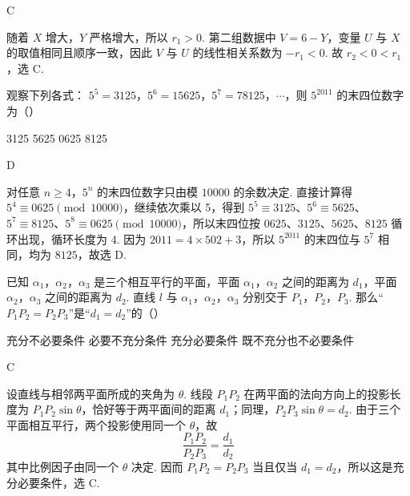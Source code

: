 \begin{answer}
C
\end{answer}

\begin{solution}
随着 \(X\) 增大，\(Y\) 严格增大，所以 \(r_1>0\). 第二组数据中
\(V=6-Y\)，变量 \(U\) 与 \(X\) 的取值相同且顺序一致，因此
\(V\) 与 \(U\) 的线性相关系数为 \(-r_1<0\). 故 \(r_2<0<r_1\)，选 C.
\end{solution}

\begin{problem}
观察下列各式： \(5^{5} = 3125\)，\(5^{6} = 15625\)，\(5^{7} = 78125\)，\(\cdots\)，则 \(5^{2011}\) 的末四位数字为（\quad）

\choices
    {3125}
    {5625}
    {0625}
    {8125}
\end{problem}

\begin{answer}
D
\end{answer}

\begin{solution}
对任意 \(n\geqslant 4\)，\(5^n\) 的末四位数字只由模 \(10000\) 的余数决定. 直接计算得
\(5^4\equiv 0625\pmod{10000}\)，继续依次乘以 5，得到
\(5^5\equiv3125\)、\(5^6\equiv5625\)、\(5^7\equiv8125\)、\(5^8\equiv0625\pmod{10000}\)，所以末四位按
\(0625\)、\(3125\)、\(5625\)、\(8125\) 循环出现，循环长度为 4.
因为 \(2011=4\times 502+3\)，所以 \(5^{2011}\) 的末四位与 \(5^7\) 相同，均为 \(8125\)，故选 D.
\end{solution}

\begin{problem}
已知 \(\alpha_{1}\)，\(\alpha_{2}\)，\(\alpha_{3}\) 是三个相互平行的平面，平面 \(\alpha_{1}\)，\(\alpha_{2}\) 之间的距离为 \(d_{1}\)，平面 \(\alpha_{2}\)，\(\alpha_{3}\) 之间的距离为 \(d_{2}\). 直线 \(l\) 与 \(\alpha_{1}\)，\(\alpha_{2}\)，\(\alpha_{3}\) 分别交于 \(P_{1}\)，\(P_{2}\)，\(P_{3}\). 那么“\(P_{1}P_{2} = P_{2}P_{3}\)”是“\(d_{1} = d_{2}\)”的（\quad）

\choices
    {充分不必要条件}
    {必要不充分条件}
    {充分必要条件}
    {既不充分也不必要条件}
\end{problem}

\begin{answer}
C
\end{answer}

\begin{solution}
设直线与相邻两平面所成的夹角为 \(\theta\). 线段 \(P_1P_2\) 在两平面的法向方向上的投影长度为 \(P_1P_2\sin\theta\)，恰好等于两平面间的距离 \(d_1\)；同理，\(P_2P_3\sin\theta=d_2\). 由于三个平面相互平行，两个投影使用同一个 \(\theta\)，故
\[
\frac{P_1P_2}{P_2P_3}=\frac{d_1}{d_2}
\]
其中比例因子由同一个 \(\theta\) 决定. 因而
\(P_1P_2=P_2P_3\) 当且仅当 \(d_1=d_2\)，所以这是充分必要条件，选 C.
\end{solution}


